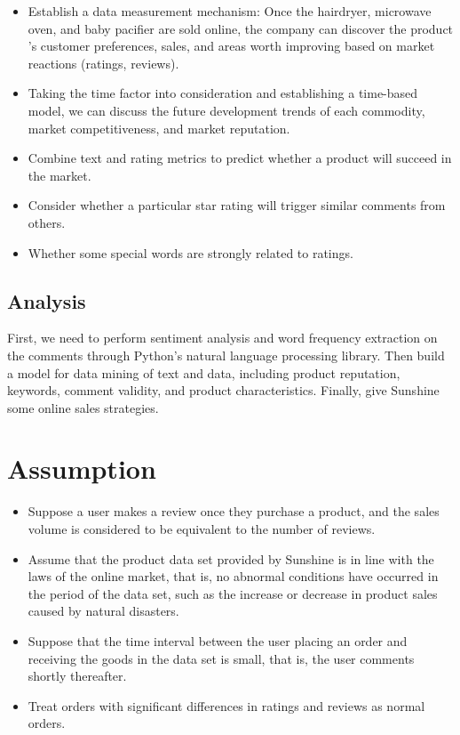 \documentclass[UTF8]{article}
\begin{document}
\begin{itemize}

	\item Establish a data measurement mechanism: Once the hairdryer, microwave oven, and baby pacifier are sold online, the company can discover the product ’s customer preferences, sales, and areas worth improving based on market reactions (ratings, reviews).

	\item Taking the time factor into consideration and establishing a time-based model, we can discuss the future development trends of each commodity, market competitiveness, and market reputation.

	\item Combine text and rating metrics to predict whether a product will succeed in the market.


	\item Consider whether a particular star rating will trigger similar comments from others.

	\item Whether some special words are strongly related to ratings.

\end{itemize}

\subsection{Analysis}

First, we need to perform sentiment analysis and word frequency extraction on the comments through Python's natural language processing library. Then build a model for data mining of text and data, including product reputation, keywords, comment validity, and product characteristics. Finally, give Sunshine some online sales strategies.

\section{Assumption}

\begin{itemize}

	\item Suppose a user makes a review once they purchase a product, and the sales volume is considered to be equivalent to the number of reviews.

	\item Assume that the product data set provided by Sunshine is in line with the laws of the online market, that is, no abnormal conditions have occurred in the period of the data set, such as the increase or decrease in product sales caused by natural disasters.

	\item Suppose that the time interval between the user placing an order and receiving the goods in the data set is small, that is, the user comments shortly thereafter.

	\item Treat orders with significant differences in ratings and reviews as normal orders.

\end{itemize}
\end{document}
